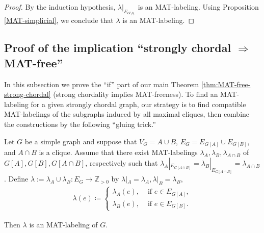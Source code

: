 \begin{proof}
By the induction hypothesis, $ \lambda|_{E_{G\setminus b_{r}}} $ is an MAT-labeling. 
Using Proposition \ref{MAT-simplicial}, we conclude that $ \lambda $ is an MAT-labeling. 
\end{proof}

\subsection{Proof of the implication ``strongly chordal  \texorpdfstring{$\Rightarrow$}{implies} MAT-free''}
\label{sub:if-part}
 
In this subsection we prove the ``if'' part of our main Theorem \ref{thm:MAT-free-strong-chordal} (strong chordality implies MAT-freeness). 
To find an MAT-labeling for a given strongly chordal graph, our strategy is to find compatible MAT-labelings of the subgraphs induced by all maximal cliques, then combine the constructions by the following ``gluing trick.''
\begin{theorem}
\label{glue}
Let $ G $ be a simple graph and suppose that $ V_{G} = A \cup B$, $E_{G} = E_{G[A]} \cup E_{G[B]} $, and $ A \cap B $ is a clique. 
Assume that there exist MAT-labelings $ \lambda_{A}, \lambda_{B}, \lambda_{A \cap B} $ of $ G[A], G[B], G[A\cap B] $, respectively  such that $ \lambda_{A}|_{E_{G[A\cap B]}} = \lambda_{B}|_{E_{G[A\cap B]}} =\lambda_{A\cap B}$. 
Define $ \lambda :=\lambda_{A} \cup \lambda_{B} \colon E_{G} \to \mathbb{Z}_{>0} $ by $\lambda|_A = \lambda_{A}, \lambda|_B = \lambda_{B}$, \ie 
\begin{align*}
\lambda(e) \coloneqq \begin{cases}
\lambda_{A}(e), & \text{ if } e \in E_{G[A]}, \\
\lambda_{B}(e), & \text{ if } e \in E_{G[B]}. 
\end{cases}
\end{align*}
\end{theorem}
\noindent
Then $ \lambda $ is an MAT-labeling of $ G $.
 
